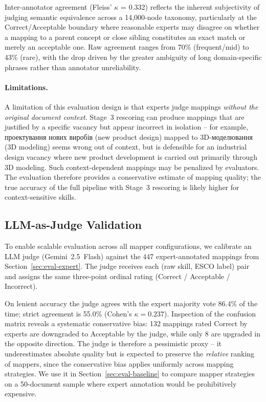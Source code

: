 \documentclass[11pt]{article}
\newcommand{\uk}[1]{{\fontencoding{T2A}\selectfont #1}}
\begin{document}
Inter-annotator agreement (Fleiss' $\kappa$ = 0.332) reflects the inherent subjectivity of judging semantic equivalence across a 14,000-node taxonomy, particularly at the Correct/Acceptable boundary where reasonable experts may disagree on whether a mapping to a parent concept or close sibling constitutes an exact match or merely an acceptable one. Raw agreement ranges from 70\% (frequent/mid) to 43\% (rare), with the drop driven by the greater ambiguity of long domain-specific phrases rather than annotator unreliability.
\paragraph{Limitations.} A limitation of this evaluation design is that experts judge mappings \emph{without the original document context}. Stage~3 rescoring can produce mappings that are justified by a specific vacancy but appear incorrect in isolation -- for example, \uk{проектування нових виробів} (new product design) mapped to \uk{3D-моделювання} (3D modeling) seems wrong out of context, but is defensible for an industrial design vacancy where new product development is carried out primarily through 3D modeling. Such context-dependent mappings may be penalized by evaluators. The evaluation therefore provides a conservative estimate of mapping quality; the true accuracy of the full pipeline with Stage~3 rescoring is likely higher for context-sensitive skills.

\subsection{LLM-as-Judge Validation}
\label{sec:eval-judge}

To enable scalable evaluation across all mapper configurations, we calibrate an LLM judge (Gemini~2.5~Flash) against the 447 expert-annotated mappings from Section~\ref{sec:eval-expert}. The judge receives each (raw skill, ESCO label) pair and assigns the same three-point ordinal rating (Correct / Acceptable / Incorrect).

On lenient accuracy the judge agrees with the expert majority vote 86.4\% of the time; strict agreement is 55.0\% (Cohen's $\kappa = 0.237$). Inspection of the confusion matrix reveals a systematic conservative bias: 132 mappings rated Correct by experts are downgraded to Acceptable by the judge, while only 8 are upgraded in the opposite direction. The judge is therefore a pessimistic proxy -- it underestimates absolute quality but is expected to preserve the \emph{relative} ranking of mappers, since the conservative bias applies uniformly across mapping strategies. We use it in Section~\ref{sec:eval-baseline} to compare mapper strategies on a 50-document sample where expert annotation would be prohibitively expensive.
\end{document}
